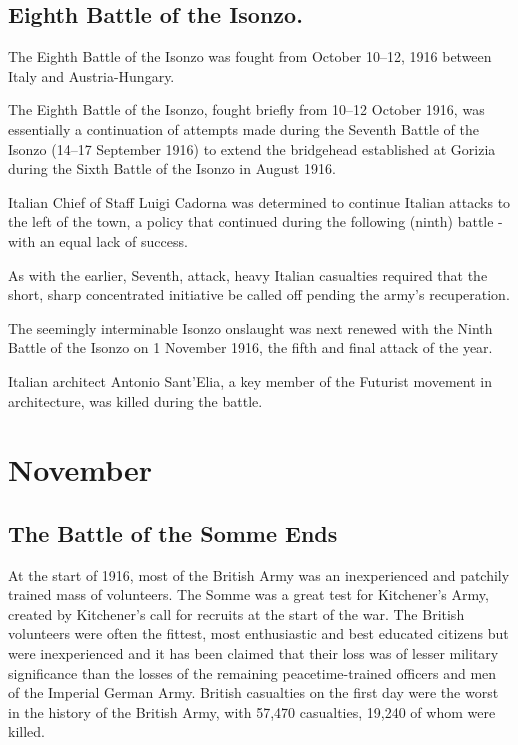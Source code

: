 \documentclass[a4paper,]{book}
\begin{document}
\section{Eighth Battle of the Isonzo. }

The Eighth Battle of the Isonzo was fought from October 10–12, 1916 between Italy and Austria-Hungary. 

The Eighth Battle of the Isonzo, fought briefly from 10–12 October 1916, was essentially a continuation of attempts made during the Seventh Battle of the Isonzo (14–17 September 1916) to extend the bridgehead established at Gorizia during the Sixth Battle of the Isonzo in August 1916.

Italian Chief of Staff Luigi Cadorna was determined to continue Italian attacks to the left of the town, a policy that continued during the following (ninth) battle - with an equal lack of success.

As with the earlier, Seventh, attack, heavy Italian casualties required that the short, sharp concentrated initiative be called off pending the army's recuperation.

The seemingly interminable Isonzo onslaught was next renewed with the Ninth Battle of the Isonzo on 1 November 1916, the fifth and final attack of the year.

Italian architect Antonio Sant'Elia, a key member of the Futurist movement in architecture, was killed during the battle. 


\chapter{November}

\section{The Battle of the Somme Ends}

At the start of 1916, most of the British Army was an inexperienced and patchily trained mass of volunteers. The Somme was a great test for Kitchener's Army, created by Kitchener's call for recruits at the start of the war. The British volunteers were often the fittest, most enthusiastic and best educated citizens but were inexperienced and it has been claimed that their loss was of lesser military significance than the losses of the remaining peacetime-trained officers and men of the Imperial German Army. British casualties on the first day were the worst in the history of the British Army, with 57,470 casualties, 19,240 of whom were killed.
\end{document}
